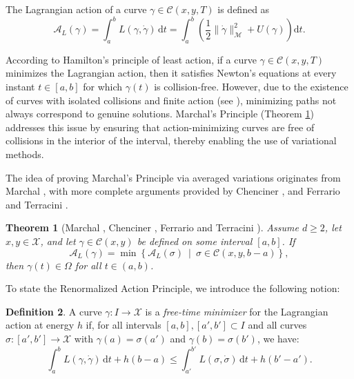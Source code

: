 \documentclass[a4paper,10pt]{amsart}
\theoremstyle{plain}
\newtheorem{thm}{Theorem}
\theoremstyle{definition}
\newtheorem{defn}[thm]{Definition}
\numberwithin{equation}{section}
\numberwithin{thm}{section}
\begin{document}
The Lagrangian action of a curve $\gamma \in \mathcal{C}(x, y, T)$ is defined as
\[
    \mathcal{A}_L(\gamma) = \int_{a}^{b} L(\gamma, \dot{\gamma})\, \mathrm{d}t = \int_{a}^{b} \left( \frac{1}{2} \|\dot{\gamma}\|_\mathcal{M}^2 + U(\gamma) \right) \mathrm{d}t.
\]

According to Hamilton's principle of least action, if a curve $\gamma \in \mathcal{C}(x, y, T)$ minimizes the Lagrangian action, then it satisfies Newton's equations at every instant $t \in [a, b]$ for which $\gamma(t)$ is collision-free. However, due to the existence of curves with isolated collisions and finite action (see \cite{Poincare_SolutionsPeriodiques}), minimizing paths not always correspond to genuine solutions. Marchal's Principle (Theorem \ref{thm_marchal}) addresses this issue by ensuring that action-minimizing curves are free of collisions in the interior of the interval, thereby enabling the use of variational methods.

The idea of proving Marchal's Principle via averaged variations originates from Marchal \cite{Marchal_MethodOfMinimization}, with more complete arguments provided by Chenciner \cite{Chenciner}, and Ferrario and Terracini \cite{FerrarioTerracini}.

\begin{thm}[Marchal \cite{Marchal_MethodOfMinimization}, Chenciner \cite{Chenciner}, Ferrario and Terracini \cite{FerrarioTerracini}]\label{thm_marchal}
Assume $d\geq 2$, let $x, y \in \mathcal{X}$, and let $\gamma \in \mathcal{C}(x, y)$ be defined on some interval $[a, b]$. If
\[
    \mathcal{A}_L(\gamma) = \min \left\{ \mathcal{A}_L(\sigma)\ \middle|\ \sigma \in \mathcal{C}(x, y, b-a) \right\},
\]
then $\gamma(t) \in \Omega$ for all $t \in (a, b)$.
\end{thm}

To state the Renormalized Action Principle, we introduce the following notion:

\begin{defn}\label{def:free-time_minimizers}
A curve $\gamma: I \to \mathcal{X}$ is a \emph{free-time minimizer} for the Lagrangian action at energy $h$ if, for all intervals $[a, b], [a', b'] \subset I$ and all curves $\sigma: [a', b'] \to \mathcal{X}$ with $\gamma(a) = \sigma(a')$ and $\gamma(b) = \sigma(b')$, we have:
\[
    \int_a^b L(\gamma, \dot{\gamma})\, \mathrm{d}t + h(b - a) \leq \int_{a'}^{b'} L(\sigma, \dot{\sigma})\, \mathrm{d}t + h(b' - a').
\]
\end{defn}
\end{document}
